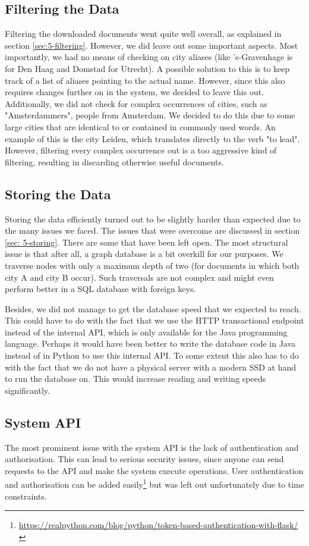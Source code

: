 \subsection{Filtering the Data}
Filtering the downloaded documents went quite well overall, as explained in section \ref{sec:5-filtering}. However, we did leave out some important aspects. Most importantly, we had no means of checking on city aliases (like 's-Gravenhage is for Den Haag and Domstad for Utrecht). A possible solution to this is to keep track of a list of aliases pointing to the actual name. However, since this also requires changes further on in the system, we decided to leave this out. Additionally, we did not check for complex occurrences of cities, such as "Amsterdammers", people from Amsterdam. We decided to do this due to some large cities that are identical to or contained in commonly used words. An example of this is the city Leiden, which translates directly to the verb "to lead". However, filtering every complex occurrence out is a too aggressive kind of filtering, resulting in discarding otherwise useful documents.

\subsection{Storing the Data}
Storing the data efficiently turned out to be slightly harder than expected due to the many issues we faced. The issues that were overcome are discussed in section \ref{sec: 5-storing}. There are some that have been left open. The most structural issue is that after all, a graph database is a bit overkill for our purposes. We traverse nodes with only a maximum depth of two (for documents in which both city A and city B occur). Such traversals are not complex and might even perform better in a SQL database with foreign keys.

Besides, we did not manage to get the database speed that we expected to reach. This could have to do with the fact that we use the HTTP transactional endpoint instead of the internal API, which is only available for the Java programming language. Perhaps it would have been better to write the database code in Java instead of in Python to use this internal API. To some extent this also has to do with the fact that we do not have a physical server with a modern SSD at hand to run the database on. This would increase reading and writing speeds significantly.

\subsection{System API}
The most prominent issue with the system API is the lack of authentication and authorisation. This can lead to serious security issues, since anyone can send requests to the API and make the system execute operations. User authentication and authorisation can be added easily\footnote{\url{https://realpython.com/blog/python/token-based-authentication-with-flask/}} but was left out unfortunately due to time constraints.

